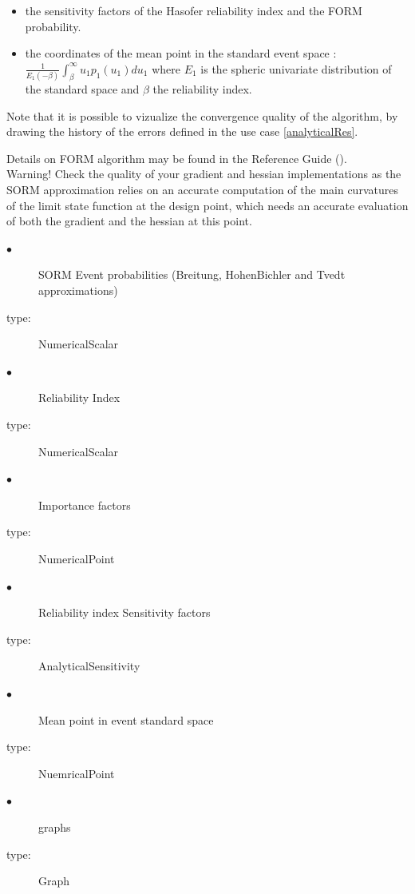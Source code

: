 \begin{itemize}
\item the sensitivity factors of the Hasofer reliability index and the FORM probability.
\item the coordinates of the mean point in the standard event space :  $\displaystyle \frac{1}{E_1(-\beta)}\int_{\beta}^{\infty} u_1 p_1(u_1)du_1$ where $E_1$ is the spheric univariate distribution of the standard space and $\beta$ the reliability index.
\end{itemize}

Note that it is possible to vizualize the convergence quality of the algorithm, by drawing the history of the  errors defined in the use case \ref{analyticalRes}.


Details on FORM algorithm  may be found in the Reference Guide ().\\


Warning! Check the quality of your gradient and hessian implementations as the SORM approximation relies on an accurate computation of the main curvatures of the limit state function at the design point, which needs an accurate evaluation of both the gradient and the hessian at this point. \\


             {
               \begin{description}
               \item[$\bullet$] SORM Event probabilities (Breitung, HohenBichler and Tvedt approximations)
               \item[type:] NumericalScalar
               \item[$\bullet$] Reliability Index
               \item[type:] NumericalScalar
               \item[$\bullet$] Importance factors
               \item[type:] NumericalPoint
               \item[$\bullet$] Reliability index Sensitivity factors
               \item[type:] AnalyticalSensitivity
               \item[$\bullet$] Mean point in event standard space
               \item[type:] NuemricalPoint
               \item[$\bullet$] graphs
               \item[type:] Graph
               \end{description}
             }

